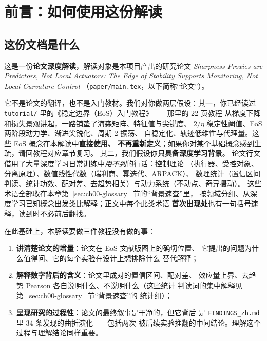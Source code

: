 \section{前言：如何使用这份解读}\label{sec:ch00}

\subsection{这份文档是什么}

这是一份\textbf{论文深度解读}，解读对象是本项目产出的研究论文
\textit{Sharpness Proxies are Predictors, Not Local Actuators: The Edge of
Stability Supports Monitoring, Not Local Curvature Control}
（\texttt{paper/main.tex}，以下简称``论文''）。

它不是论文的翻译，也不是入门教材。我们对你做两层假设：其一，你已经读过
\texttt{tutorial/} 里的《稳定边界（EoS）入门教程》——那里的 22 页教程
从梯度下降和损失景观讲起，一路铺垫了海森矩阵、特征值与尖锐度、
$2/\eta$ 稳定性阈值、EoS 两阶段动力学、渐进尖锐化、周期-2 振荡、
自稳定化、轨迹低维性与代理量。这些 EoS 概念在本解读中\textbf{直接使用、
不再重新定义}；如果你对某个基础概念感到生疏，请回教程对应章节复习。
其二，我们假设你\textbf{只具备深度学习背景}。
论文行文借用了大量深度学习日常训练中\emph{用不到}的行话：控制理论
（执行器、受控对象、分离原理）、数值线性代数（瑞利商、幂迭代、ARPACK）、
数理统计（置信区间判读、统计功效、配对差、去趋势相关）与动力系统（不动点、奇异摄动）。
这些术语全部收在本章第~\ref{sec:ch00-glossary}~节的``背景速查''里，
按领域分组、从深度学习已知概念出发类比解释；正文中每个此类术语
\textbf{首次出现处}也有一句括号速释，读到时不必前后翻找。

在此基础上，本解读要做三件教程没有做的事：

\begin{enumerate}
  \item \textbf{讲清楚论文的增量}：论文在 EoS 文献版图上的确切位置、
        它提出的问题为什么值得问、它的每个实验在设计上想排除什么
        替代解释；
  \item \textbf{解释数字背后的含义}：论文里成对的置信区间、配对差、
        效应量上界、去趋势 Pearson 各自说明什么、不说明什么（这些统计
        判读词的集中解释见第~\ref{sec:ch00-glossary}~节``背景速查''的
        统计组）；
  \item \textbf{呈现研究的过程性}：论文的最终叙事是干净的，但它背后
        是 \texttt{FINDINGS\_zh.md} 里 34 条发现的曲折演化——包括两次
        被后续实验推翻的中间结论。理解这个过程与理解结论同样重要。
\end{enumerate}

